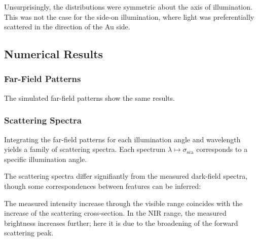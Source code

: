 \documentclass[10pt]{article}
\begin{document}
Unsurprisingly, the distributions were symmetric about the axis of illumination. 
This was not the case for the side-on illumination, where light was preferentially scattered in the direction of the Au side. 








\subsection*{Numerical Results}


\subsubsection*{Far-Field Patterns}

The simulated far-field patterns show the same results. 

\subsubsection*{Scattering Spectra}

Integrating the far-field patterns for each illumination angle and wavelength yields a family of scattering spectra. 
Each spectrum $\lambda\mapsto\sigma_\mathrm{sca}$ corresponds to a specific illumination angle. 

The scattering spectra differ signifiantly from the measured dark-field spectra, though some correspondences between features can be inferred: 

The measured intensity increase through the visible range coincides with the increase of the scattering cross-section. 
In the NIR range, the measured brightness increases further; here it is due to the broadening of the forward scattering peak. 
\end{document}
